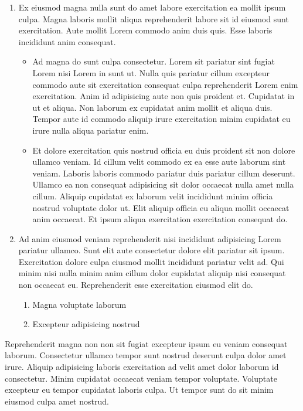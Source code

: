 \documentclass[
    12pt,
    letterpaper,
    oneside,
    noraggedright
]{turabian-researchpaper}
\makeatletter
\providecommand{\tightlist}{%
    \ifthenelse{\equal{\the\@listdepth}{1}}
    {}
    {\vspace{-\baselineskip}}
}
\makeatother
\begin{document}
\begin{enumerate}
\def\labelenumi{\arabic{enumi}.}
\tightlist
\item
  Ex eiusmod magna nulla sunt do amet labore exercitation ea mollit
  ipsum culpa. Magna laboris mollit aliqua reprehenderit labore sit id
  eiusmod sunt exercitation. Aute mollit Lorem commodo anim duis quis.
  Esse laboris incididunt anim consequat.

  \begin{itemize}
  \tightlist
  \item
    Ad magna do sunt culpa consectetur. Lorem sit pariatur sint fugiat
    Lorem nisi Lorem in sunt ut. Nulla quis pariatur cillum excepteur
    commodo aute sit exercitation consequat culpa reprehenderit Lorem
    enim exercitation. Anim id adipisicing aute non quis proident et.
    Cupidatat in ut et aliqua. Non laborum ex cupidatat anim mollit et
    aliqua duis. Tempor aute id commodo aliquip irure exercitation minim
    cupidatat eu irure nulla aliqua pariatur enim.
  \item
    Et dolore exercitation quis nostrud officia eu duis proident sit non
    dolore ullamco veniam. Id cillum velit commodo ex ea esse aute
    laborum sint veniam. Laboris laboris commodo pariatur duis pariatur
    cillum deserunt. Ullamco ea non consequat adipisicing sit dolor
    occaecat nulla amet nulla cillum. Aliquip cupidatat ex laborum velit
    incididunt minim officia nostrud voluptate dolor ut. Elit aliquip
    officia eu aliqua mollit occaecat anim occaecat. Et ipsum aliqua
    exercitation exercitation consequat do.
  \end{itemize}
\item
  Ad anim eiusmod veniam reprehenderit nisi incididunt adipisicing Lorem
  pariatur ullamco. Sunt elit aute consectetur dolore elit pariatur sit
  ipsum. Exercitation dolore culpa eiusmod mollit incididunt pariatur
  velit ad. Qui minim nisi nulla minim anim cillum dolor cupidatat
  aliquip nisi consequat non occaecat eu. Reprehenderit esse
  exercitation eiusmod elit do.

  \begin{enumerate}
  \def\labelenumii{\arabic{enumii}.}
  \tightlist
  \item
    Magna voluptate laborum
  \item
    Excepteur adipisicing nostrud
  \end{enumerate}
\end{enumerate}

\noindent Reprehenderit magna non non sit fugiat excepteur ipsum eu
veniam consequat laborum. Consectetur ullamco tempor sunt nostrud
deserunt culpa dolor amet irure. Aliquip adipisicing laboris
exercitation ad velit amet dolor laborum id consectetur. Minim cupidatat
occaecat veniam tempor voluptate. Voluptate excepteur eu tempor
cupidatat laboris culpa. Ut tempor sunt do sit minim eiusmod culpa amet
nostrud.
\end{document}
